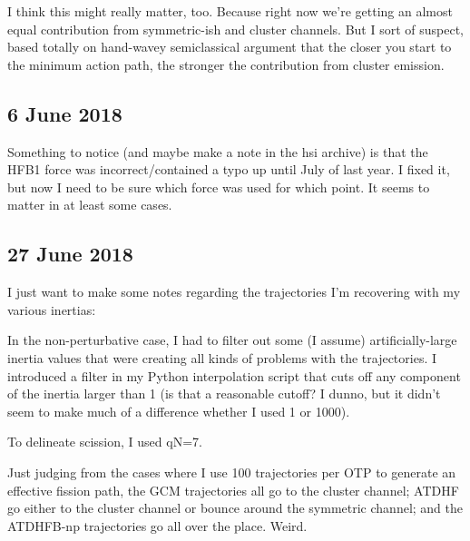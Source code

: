 I think this might really matter, too. Because right now we're getting an almost equal contribution from symmetric-ish and cluster channels. But I sort of suspect, based totally on hand-wavey semiclassical argument that the closer you start to the minimum action path, the stronger the contribution from cluster emission.

\subsection*{6 June 2018}
Something to notice (and maybe make a note in the hsi archive) is that the HFB1 force was incorrect/contained a typo up until July of last year. I fixed it, but now I need to be sure which force was used for which point. It seems to matter in at least some cases.

\subsection*{27 June 2018}
I just want to make some notes regarding the trajectories I'm recovering with my various inertias:

In the non-perturbative case, I had to filter out some (I assume) artificially-large inertia values that were creating all kinds of problems with the trajectories. I introduced a filter in my Python interpolation script that cuts off any component of the inertia larger than 1 (is that a reasonable cutoff? I dunno, but it didn't seem to make much of a difference whether I used 1 or 1000).

To delineate scission, I used qN=7.

Just judging from the cases where I use 100 trajectories per OTP to generate an effective fission path, the GCM trajectories all go to the cluster channel; ATDHF go either to the cluster channel or bounce around the symmetric channel; and the ATDHFB-np trajectories go all over the place. Weird.

